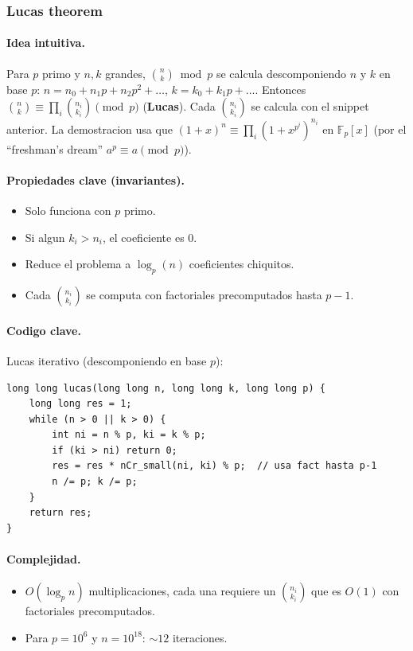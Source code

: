 ﻿\subsubsection{Lucas theorem}

\paragraph{Idea intuitiva.}
Para $p$ primo y $n, k$ grandes, $\binom{n}{k} \bmod p$ se calcula descomponiendo $n$ y $k$ en base $p$: $n = n_0 + n_1 p + n_2 p^2 + \dots$, $k = k_0 + k_1 p + \dots$. Entonces $\binom{n}{k} \equiv \prod_i \binom{n_i}{k_i} \pmod p$ (\textbf{Lucas}). Cada $\binom{n_i}{k_i}$ se calcula con el snippet anterior. La demostracion usa que $(1+x)^n \equiv \prod_i (1+x^{p^i})^{n_i}$ en $\mathbb{F}_p[x]$ (por el ``freshman's dream'' $a^p \equiv a \pmod p$).

\paragraph{Propiedades clave (invariantes).}
\begin{itemize}\setlength\itemsep{0pt}
	\item Solo funciona con $p$ primo.
	\item Si algun $k_i > n_i$, el coeficiente es 0.
	\item Reduce el problema a $\log_p(n)$ coeficientes chiquitos.
	\item Cada $\binom{n_i}{k_i}$ se computa con factoriales precomputados hasta $p-1$.
\end{itemize}

\paragraph{Codigo clave.}
Lucas iterativo (descomponiendo en base $p$):
\begin{verbatim}
long long lucas(long long n, long long k, long long p) {
    long long res = 1;
    while (n > 0 || k > 0) {
        int ni = n % p, ki = k % p;
        if (ki > ni) return 0;
        res = res * nCr_small(ni, ki) % p;  // usa fact hasta p-1
        n /= p; k /= p;
    }
    return res;
}
\end{verbatim}

\paragraph{Complejidad.}
\begin{itemize}\setlength\itemsep{0pt}
	\item $O(\log_p n)$ multiplicaciones, cada una requiere un $\binom{n_i}{k_i}$ que es $O(1)$ con factoriales precomputados.
	\item Para $p = 10^6$ y $n = 10^{18}$: $\sim 12$ iteraciones.
\end{itemize}

